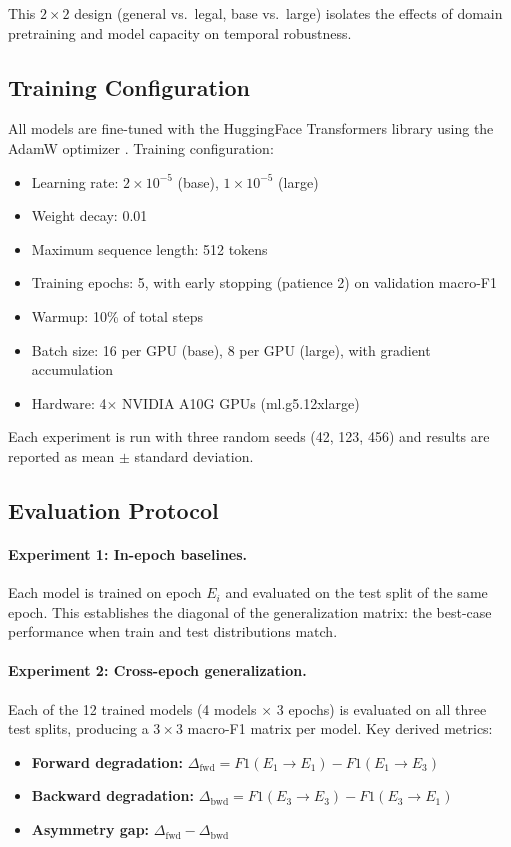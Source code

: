 \documentclass[11pt]{article}
\begin{document}
This $2 \times 2$ design (general vs.\ legal, base vs.\ large) isolates the effects of domain pretraining and model capacity on temporal robustness.

\subsection{Training Configuration}

All models are fine-tuned with the HuggingFace Transformers library \citep{wolf2020transformers} using the AdamW optimizer \citep{loshchilov2019decoupled}. Training configuration:

\begin{itemize}[nosep]
  \item Learning rate: $2 \times 10^{-5}$ (base), $1 \times 10^{-5}$ (large)
  \item Weight decay: 0.01
  \item Maximum sequence length: 512 tokens
  \item Training epochs: 5, with early stopping (patience 2) on validation macro-F1
  \item Warmup: 10\% of total steps
  \item Batch size: 16 per GPU (base), 8 per GPU (large), with gradient accumulation
  \item Hardware: 4$\times$ NVIDIA A10G GPUs (ml.g5.12xlarge)
\end{itemize}

Each experiment is run with three random seeds (42, 123, 456) and results are reported as mean $\pm$ standard deviation.

\subsection{Evaluation Protocol}

\paragraph{Experiment 1: In-epoch baselines.}
Each model is trained on epoch $E_i$ and evaluated on the test split of the same epoch. This establishes the diagonal of the generalization matrix: the best-case performance when train and test distributions match.

\paragraph{Experiment 2: Cross-epoch generalization.}
Each of the 12 trained models (4 models $\times$ 3 epochs) is evaluated on all three test splits, producing a $3 \times 3$ macro-F1 matrix per model. Key derived metrics:
\begin{itemize}[nosep]
  \item \textbf{Forward degradation:} $\Delta_{\text{fwd}} = F1(E_1 \rightarrow E_1) - F1(E_1 \rightarrow E_3)$
  \item \textbf{Backward degradation:} $\Delta_{\text{bwd}} = F1(E_3 \rightarrow E_3) - F1(E_3 \rightarrow E_1)$
  \item \textbf{Asymmetry gap:} $\Delta_{\text{fwd}} - \Delta_{\text{bwd}}$
\end{itemize}
\end{document}

